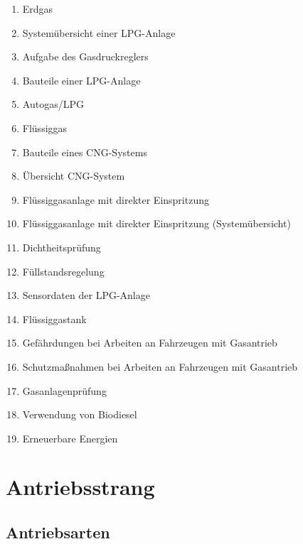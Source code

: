 \begin{enumerate}
\item
  Erdgas\\
\item
  Systemübersicht einer LPG-Anlage\\
\item
  Aufgabe des Gasdruckreglers\\
\item
  Bauteile einer LPG-Anlage\\
\item
  Autogas/LPG\\
\item
  Flüssiggas\\
\item
  Bauteile eines CNG-Systems\\
\item
  Übersicht CNG-System\\
\item
  Flüssiggasanlage mit direkter Einspritzung\\
\item
  Flüssiggasanlage mit direkter Einspritzung (Systemübersicht)\\
\item
  Dichtheitsprüfung\\
\item
  Füllstandsregelung\\
\item
  Sensordaten der LPG-Anlage\\
\item
  Flüssiggastank\\
\item
  Gefährdungen bei Arbeiten an Fahrzeugen mit Gasantrieb\\
\item
  Schutzmaßnahmen bei Arbeiten an Fahrzeugen mit Gasantrieb\\
\item
  Gasanlagenprüfung\\
\item
  Verwendung von Biodiesel\\
\item
  Erneuerbare Energien
\end{enumerate}

\section{Antriebsstrang}\label{antriebsstrang}

\subsection{Antriebsarten}\label{antriebsarten}

